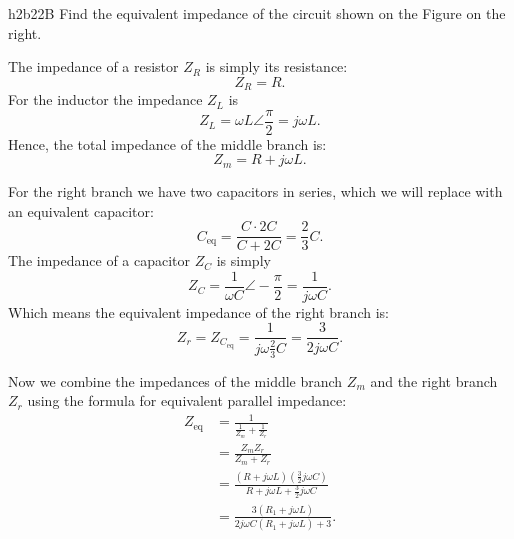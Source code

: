   \begin{problemwithimage}{h2b2}{2B}
    Find the equivalent impedance of the circuit shown on the Figure on the right.
  \end{problemwithimage}

  {\color{AUred}
  \begin{derivation}
    The impedance of a resistor $Z_R$ is simply its resistance:
    \begin{equation*}
      Z_R = R
    .\end{equation*}
    For the inductor the impedance $Z_L$ is
    \begin{equation*}
      Z_L = \omega L \angle \frac{\pi}{2} = j \omega L
    .\end{equation*}
    Hence, the total impedance of the middle branch is:
    \begin{equation*}
      Z_m = R + j \omega L
    .\end{equation*}
    
    For the right branch we have two capacitors in series, which we will replace with an equivalent capacitor:
    \begin{equation*}
      C_{\mathrm{eq}} = \frac{C \cdot 2C}{C + 2C} = \frac{2}{3}C
    .\end{equation*}
    The impedance of a capacitor $Z_C$ is simply
    \begin{equation*}
      Z_C = \frac{1}{\omega C} \angle - \frac{\pi}{2} = \frac{1}{j \omega C}
    .\end{equation*}
    Which means the equivalent impedance of the right branch is:
    \begin{equation*}
      Z_r = Z_{C_{\mathrm{eq}}} = \frac{1}{j \omega \frac{2}{3} C} = \frac{3}{2 j \omega C}
    .\end{equation*}
    
    Now we combine the impedances of the middle branch $Z_m$ and the right branch $Z_r$ using the formula for equivalent parallel impedance:
    \begin{align*}
      Z_{\mathrm{eq}} &= \frac{1}{\frac{1}{Z_m} + \frac{1}{Z_r}} \\
      &= \frac{Z_m Z_r}{Z_m + Z_r} \\
      &= \frac{\left( R + j \omega L \right) \left( \frac{3}{2} j\omega C \right)}{R + j \omega L + \frac{3}{2} j \omega C} \\
      &= \frac{3 \left( R_1 + j \omega L \right)}{2 j \omega C \left( R_1 + j \omega L \right) + 3}
    .\end{align*}
  \end{derivation}
  }


